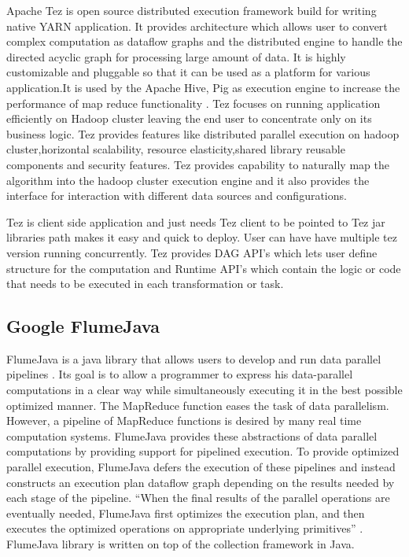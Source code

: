     Apache Tez is open source distributed execution framework build
    for writing native YARN application. It provides architecture
    which allows user to convert complex computation as dataflow
    graphs and the distributed engine to handle the directed acyclic
    graph for processing large amount of data. It is highly
    customizable and pluggable so that it can be used as a platform
    for various application.It is used by the Apache Hive, Pig as
    execution engine to increase the performance of map reduce
    functionality \cite{www-apache-tez}. Tez focuses on running
    application efficiently on Hadoop cluster leaving the end user to
    concentrate only on its business logic. Tez provides features like
    distributed parallel execution on hadoop cluster,horizontal
    scalability, resource elasticity,shared library reusable
    components and security features. Tez provides capability to
    naturally map the algorithm into the hadoop cluster execution
    engine and it also provides the interface for interaction with
    different data sources and configurations.
	
    Tez is client side application and just needs Tez client to be
    pointed to Tez jar libraries path makes it easy and quick to
    deploy. User can have have multiple tez version running
    concurrently. Tez provides DAG API's which lets user define
    structure for the computation and Runtime API's which contain the
    logic or code that needs to be executed in each transformation or
    task.

\subsection{Google FlumeJava \vc}

    FlumeJava is a java library that
    allows users to develop and run data parallel
    pipelines \cite{www-flumejava-google}. Its goal is to allow a
    programmer to express his data-parallel computations
    in a clear way while simultaneously executing it in the best
    possible optimized manner. The MapReduce function eases the task
    of data parallelism. However, a pipeline of MapReduce functions is
    desired by many real time computation systems. FlumeJava provides
    these abstractions of data parallel computations by providing
    support for pipelined execution. To provide optimized parallel
    execution, FlumeJava defers the execution of these pipelines and
    instead constructs an execution plan dataflow graph depending on
    the results needed by each stage of the pipeline. ``When the final
    results of the parallel operations are eventually needed,
    FlumeJava first optimizes the execution plan, and then executes
    the optimized operations on appropriate underlying primitives''
    \cite{flumejava-paper}. FlumeJava library is written on top of
    the collection framework in Java.

